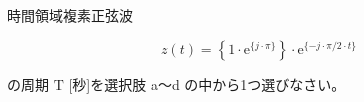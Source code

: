 時間領域複素正弦波

\[
z(t) =  \left \{ 1 \cdot \textrm{e}^{\{j \cdot \pi \}} \right \} \cdot \textrm{e}^{\{ -j \cdot \pi/2 \cdot t \}}
\]

\bigskip
\noindent の周期 $\textrm{T}$ [秒]を選択肢 a〜d の中から1つ選びなさい。
